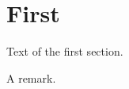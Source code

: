 \documentclass{scrartcl}
\begin{document}
\listofremarks
\section{First}
Text of the first section.
\begin{remark}
A remark.
\caption{New remark}
\end{remark}
\end{document}
